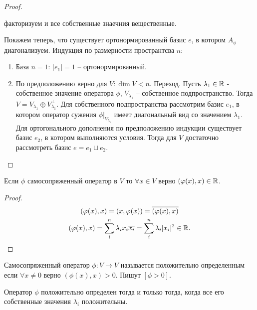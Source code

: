 \begin{proof}
\begin{enumerate}
\begin{enumerate}
            факторизуем и все собственные знаечния вещественные.
        \end{enumerate}
        Покажем теперь, что существует ортонормированный базис $e$, в котором $A_{\phi}$ диагонализуем. Индукция по 
        размерности пространтсва $n$:
        \begin{enumerate}
            \item База $n = 1$: $|e_1| = 1$ -- ортонормированный.
            \item По предположению верно для $V: \dim V < n$. Переход. Пусть $\lambda_1 \in \mathbb{R}$ - собственное значение оператора $\phi$, $V_{\lambda_1}$ -- собственное подпространство. Тогда $V  = V_{\lambda_1} \oplus V_{\lambda_1}^{\perp}$. Для собственного подпространства рассмотрим базис $e_1$, в котором оператор сужения $\phi \vert_{V_{\lambda_1}}$ имеет диагональный вид со значением $\lambda_1$. Для ортогонального дополнения по предположению индукции существует базис $e_2$, в котором выполняются условия. Тогда для $V$ достаточно рассмотреть базис $e = e_1 \sqcup e_2$.
        \end{enumerate}
    \end{enumerate}
\end{proof}

\begin{note}
    Если $\phi$ самосопряженный оператор в $V$ то $\forall x \in V$ верно $(\varphi(x), x) \in \mathbb{R}$.
\end{note}

\begin{proof}
    \begin{gather*}
        (\varphi(x), x) = (x, \varphi(x)) = \overline{(\varphi(x), x)} \\
        (\varphi(x), x) = \displaystyle \sum_{i}^{n} \lambda_i x_i \overline{x_i} = \displaystyle \sum_{i}^{n} \lambda_i |x_i|^2 \in \mathbb{R}.
    \end{gather*}
\end{proof}

\begin{definition}
    Самосопряженный оператор $\phi: V \to V$ называется положительно определенным если $\forall x \neq 0$ верно $(\phi(x), x) > 0$. Пишут $[\phi > 0]$.
\end{definition}

\begin{corollary}
    Оператор $\phi$ положительно определен тогда и только тогда, когда все его собственные значения $\lambda_i$ положительны.
\end{corollary}


